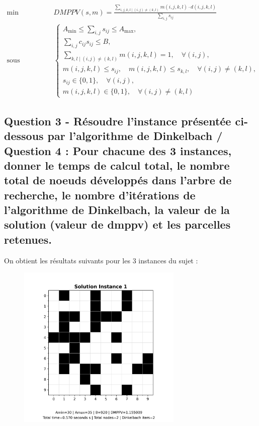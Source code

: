 \documentclass[a4paper,11pt]{article}
\begin{document}
\[
\begin{aligned}
\min \quad & DMPPV(s,m) =
\frac{
\displaystyle\sum_{i,j,k,l \;\big|\; (i,j) \neq (k,l)} m(i,j,k,l) \cdot d(i,j,k,l)
}{
\displaystyle\sum_{i,j} s_{ij}
} \\[4pt]
\text{sous contraintes} \quad &
\begin{cases}
A_{\min} \leq \displaystyle\sum_{i,j}  s_{ij} \leq A_{\max},\\[4pt]
\displaystyle\sum_{i,j} c_{ij} s_{ij} \leq B,\\[4pt]
\sum_{k,l \;\big|\; (i,j) \neq (k,l)} m(i,j,k,l) = 1, \quad \forall (i,j),\\[2pt]
m(i,j,k,l) \leq s_{ij}, \quad m(i,j,k,l) \leq s_{k,l}, \quad \forall (i,j) \neq (k,l),\\[2pt]
s_{ij} \in \{0,1\}, \quad \forall (i,j),\\
m(i,j,k,l) \in \{0,1\}, \quad \forall (i,j) \neq (k,l)
\end{cases}
\end{aligned}
\]
\subsection{Question 3 - Résoudre l'instance présentée ci-dessous par l'algorithme de Dinkelbach / Question 4 : Pour chacune des 3 instances, donner le temps de calcul total, le nombre total de noeuds
développés dans l'arbre de recherche, le nombre d'itérations de l'algorithme de Dinkelbach, la valeur de la solution (valeur de dmppv) et les parcelles retenues.
}

On obtient les résultats suivants pour les 3 instances du sujet : 

\begin{figure}[H]
  \centering
  \includegraphics[width=0.7\textwidth]{figs/solution1_output.png}
\end{figure}
\end{document}
